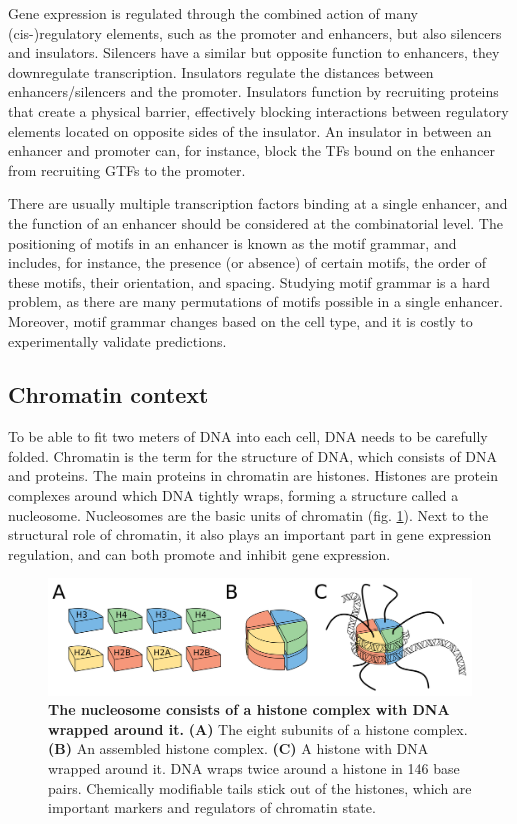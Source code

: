 Gene expression is regulated through the combined action of many (cis-)regulatory elements, such as the promoter and enhancers, but also silencers and insulators\cite{Spitz2012}. Silencers have a similar but opposite function to enhancers, they downregulate transcription. Insulators regulate the distances between enhancers/silencers and the promoter. Insulators function by recruiting proteins that create a physical 
barrier, effectively blocking interactions between regulatory elements located on opposite sides of the insulator. An insulator in between an enhancer and promoter can, for instance, block the TFs bound on the enhancer from recruiting GTFs to the promoter.

There are usually multiple transcription factors binding at a single enhancer, and the function of an enhancer should be considered at the combinatorial level. The positioning of motifs in an enhancer is known as the motif grammar, and includes, for instance, the presence (or absence) of certain motifs, the order of these motifs, their orientation, and spacing. Studying motif grammar is a hard problem, as there are many permutations of motifs possible in a single enhancer. Moreover, motif grammar changes based on the cell type, and it is costly to experimentally validate predictions.

\subsection{Chromatin context}

To be able to fit two meters of DNA into each cell, DNA needs to be carefully folded. Chromatin is the term for the structure of DNA, which consists of DNA and proteins. The main proteins in chromatin are histones. Histones are protein complexes around which DNA tightly wraps, forming a structure called a nucleosome. Nucleosomes are the basic units of chromatin (fig. \ref{fig:histones}). Next to the structural role of chromatin,  it also plays an important part in gene expression regulation, and can both promote and inhibit gene expression.

\begin{figure}
    \center
    \includegraphics[width=0.8\linewidth]{ch.introduction/imgs/histones.png}
    \caption{\textbf{The nucleosome consists of a histone complex with DNA wrapped around it.} \textbf{(A)} The eight subunits of a histone complex. \textbf{(B)} An assembled histone complex. \textbf{(C)} A histone with DNA wrapped around it. DNA wraps twice around a histone in 146 base pairs. Chemically modifiable tails stick out of the histones, which are important markers and regulators of chromatin state.}
    \label{fig:histones}
\end{figure}

